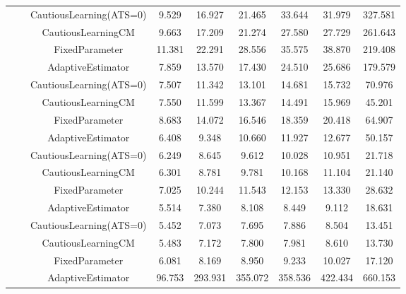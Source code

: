 \begin{table}[!h]
\begin{tabular}[t]{ccccccccc}
 &  & CautiousLearning(ATS=0) & 9.529 & 16.927 & 21.465 & 33.644 & 31.979 & 327.581\\

 &  & CautiousLearningCM & 9.663 & 17.209 & 21.274 & 27.580 & 27.729 & 261.643\\

 & \multirow[t]{-4}{*}{\centering\arraybackslash 0.75} & FixedParameter & 11.381 & 22.291 & 28.556 & 35.575 & 38.870 & 219.408\\
\cmidrule{2-9}
 &  & AdaptiveEstimator & 7.859 & 13.570 & 17.430 & 24.510 & 25.686 & 179.579\\

 &  & CautiousLearning(ATS=0) & 7.507 & 11.342 & 13.101 & 14.681 & 15.732 & 70.976\\

 &  & CautiousLearningCM & 7.550 & 11.599 & 13.367 & 14.491 & 15.969 & 45.201\\

 & \multirow[t]{-4}{*}{\centering\arraybackslash 1.00} & FixedParameter & 8.683 & 14.072 & 16.546 & 18.359 & 20.418 & 64.907\\
\cmidrule{2-9}
 &  & AdaptiveEstimator & 6.408 & 9.348 & 10.660 & 11.927 & 12.677 & 50.157\\

 &  & CautiousLearning(ATS=0) & 6.249 & 8.645 & 9.612 & 10.028 & 10.951 & 21.718\\

 &  & CautiousLearningCM & 6.301 & 8.781 & 9.781 & 10.168 & 11.104 & 21.140\\

 & \multirow[t]{-4}{*}{\centering\arraybackslash 1.25} & FixedParameter & 7.025 & 10.244 & 11.543 & 12.153 & 13.330 & 28.632\\
\cmidrule{2-9}
 &  & AdaptiveEstimator & 5.514 & 7.380 & 8.108 & 8.449 & 9.112 & 18.631\\

 &  & CautiousLearning(ATS=0) & 5.452 & 7.073 & 7.695 & 7.886 & 8.504 & 13.451\\

 &  & CautiousLearningCM & 5.483 & 7.172 & 7.800 & 7.981 & 8.610 & 13.730\\

\multirow[t]{-28}{*}{\centering\arraybackslash 1} & \multirow[t]{-4}{*}{\centering\arraybackslash 1.50} & FixedParameter & 6.081 & 8.169 & 8.950 & 9.233 & 10.027 & 17.120\\
\cmidrule{1-9}
 &  & AdaptiveEstimator & 96.753 & 293.931 & 355.072 & 358.536 & 422.434 & 660.153\\


\end{tabular}
\end{table}
